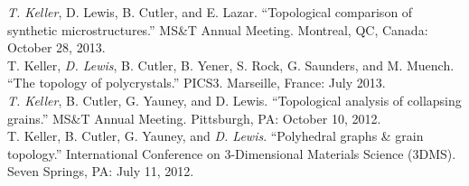 \documentclass[margin]{res}
\begin{document}
\begin{resume}
\textit{T. Keller}, D. Lewis, B. Cutler, and E. Lazar. ``Topological comparison of synthetic microstructures.''
 MS\&T Annual Meeting. Montreal, QC, Canada: October 28, 2013.\\[0.25\baselineskip]
T. Keller, \textit{D. Lewis}, B. Cutler, B. Yener, S. Rock, G. Saunders, and M. Muench. ``The topology of polycrystals.''
 PICS3. Marseille, France: July 2013.\\[0.25\baselineskip]
\textit{T. Keller}, B. Cutler, G. Yauney, and D. Lewis. ``Topological analysis of collapsing grains.''
 MS\&T Annual Meeting. Pittsburgh, PA: October 10, 2012.\\[0.25\baselineskip]
T. Keller, B. Cutler, G. Yauney, and \textit{D. Lewis}. ``Polyhedral graphs \& grain topology.''
 International Conference on 3-Dimensional Materials Science (3DMS). Seven Springs, PA: July 11, 2012.\\[0.25\baselineskip]
\end{resume}
\end{document}
